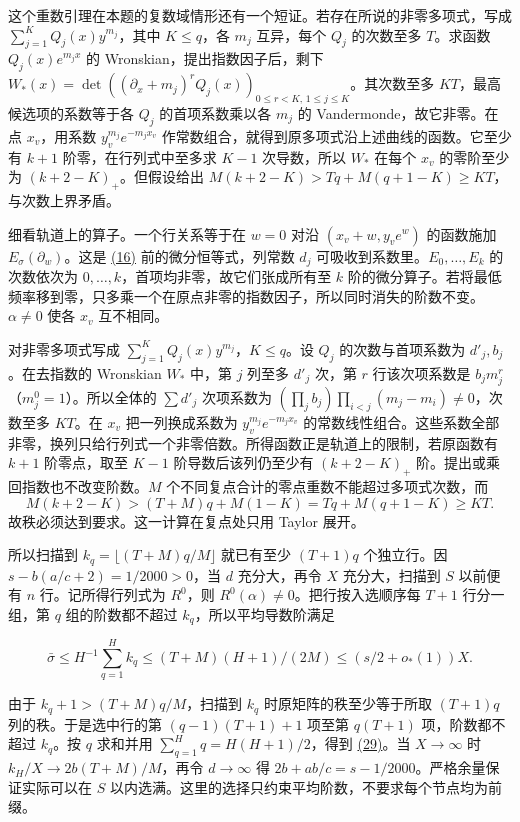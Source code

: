 \documentclass[11pt,a4paper]{article}
\begin{document}
这个重数引理在本题的复数域情形还有一个短证。若存在所说的非零多项式，写成 \(\sum_{j=1}^KQ_j(x)y^{m_j}\)，其中 \(K\le q\)，各 \(m_j\) 互异，每个 \(Q_j\) 的次数至多 \(T\)。求函数 \(Q_j(x)e^{m_jx}\) 的 Wronskian，提出指数因子后，剩下 \(W_*(x)=\det((\partial_x+m_j)^rQ_j(x))_{0\le r<K,\,1\le j\le K}\)。其次数至多 \(KT\)，最高候选项的系数等于各 \(Q_j\) 的首项系数乘以各 \(m_j\) 的 Vandermonde，故它非零。在点 \(x_v\)，用系数 \(y_v^{m_j}e^{-m_jx_v}\) 作常数组合，就得到原多项式沿上述曲线的函数。它至少有 \(k+1\) 阶零，在行列式中至多求 \(K-1\) 次导数，所以 \(W_*\) 在每个 \(x_v\) 的零阶至少为 \((k+2-K)_+\)。但假设给出 \(M(k+2-K)>Tq+M(q+1-K)\ge KT\)，与次数上界矛盾。

细看轨道上的算子。一个行关系等于在 \(w=0\) 对沿 \((x_v+w,y_ve^w)\) 的函数施加 \(E_\sigma(\partial_w)\)。这是 \hyperref[eq:16]{(16)} 前的微分恒等式，列常数 \(d_j\) 可吸收到系数里。\(E_0,\ldots,E_k\) 的次数依次为 \(0,\ldots,k\)，首项均非零，故它们张成所有至 \(k\) 阶的微分算子。若将最低频率移到零，只多乘一个在原点非零的指数因子，所以同时消失的阶数不变。\(\alpha\ne0\) 使各 \(x_v\) 互不相同。

对非零多项式写成 \(\sum_{j=1}^KQ_j(x)y^{m_j}\)，\(K\le q\)。设 \(Q_j\) 的次数与首项系数为 \(d'_j,b_j\)。在去指数的 Wronskian \(W_*\) 中，第 \(j\) 列至多 \(d'_j\) 次，第 \(r\) 行该次项系数是 \(b_jm_j^r\)（\(m_j^0=1\)）。所以全体的 \(\sum d'_j\) 次项系数为 \((\prod_j b_j)\prod_{i<j}(m_j-m_i)\ne0\)，次数至多 \(KT\)。在 \(x_v\) 把一列换成系数为 \(y_v^{m_j}e^{-m_j x_v}\) 的常数线性组合。这些系数全部非零，换列只给行列式一个非零倍数。所得函数正是轨道上的限制，若原函数有 \(k+1\) 阶零点，取至 \(K-1\) 阶导数后该列仍至少有 \((k+2-K)_+\) 阶。提出或乘回指数也不改变阶数。\(M\) 个不同复点合计的零点重数不能超过多项式次数，而 \[
 M(k+2-K)>(T+M)q+M(1-K)=Tq+M(q+1-K)\ge KT .
\] 故秩必须达到要求。这一计算在复点处只用 Taylor 展开。

所以扫描到 \(k_q=\lfloor(T+M)q/M\rfloor\) 就已有至少 \((T+1)q\) 个独立行。因 \(s-b(a/c+2)=1/2000>0\)，当 \(d\) 充分大，再令 \(X\) 充分大，扫描到 \(S\) 以前便有 \(n\) 行。记所得行列式为 \(R^0\)，则 \(R^0(\alpha)\ne0\)。把行按入选顺序每 \(T+1\) 行分一组，第 \(q\) 组的阶数都不超过 \(k_q\)，所以平均导数阶满足

\[
 \bar\sigma\le H^{-1}\sum_{q=1}^H k_q
 \le (T+M)(H+1)/(2M)\le (s/2+o_*(1))X .                                 \tag{29}\label{eq:29}
\]

由于 \(k_q+1>(T+M)q/M\)，扫描到 \(k_q\) 时原矩阵的秩至少等于所取 \((T+1)q\) 列的秩。于是选中行的第 \((q-1)(T+1)+1\) 项至第 \(q(T+1)\) 项，阶数都不超过 \(k_q\)。按 \(q\) 求和并用 \(\sum_{q=1}^Hq=H(H+1)/2\)，得到 \hyperref[eq:29]{(29)}。当 \(X\to\infty\) 时 \(k_H/X\to 2b(T+M)/M\)，再令 \(d\to\infty\) 得 \(2b+ab/c=s-1/2000\)。严格余量保证实际可以在 \(S\) 以内选满。这里的选择只约束平均阶数，不要求每个节点均为前缀。
\end{document}
